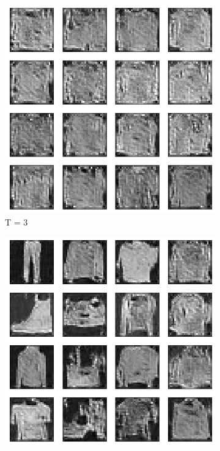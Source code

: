 \documentclass{article}
\begin{document}
\begin{figure}[H]
	\begin{subfigure}[h]{0.3\linewidth}
		\centering
		\includegraphics[scale=0.3]{../code/figures/generated_DDGAN_wd_3.png}
		\caption{T = 3}
	\end{subfigure}
	\hfill
	\begin{subfigure}[h]{0.3\linewidth}
		\centering
		\includegraphics[scale=0.3]{../code/figures/generated_DDGAN_wd_5.png}

\end{subfigure}
\end{figure}
\end{document}
